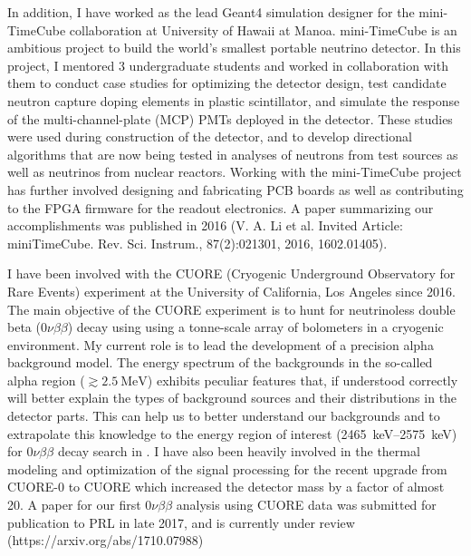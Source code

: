 \documentclass[10pt]{article} %
\begin{document}
In addition, I have worked as the lead Geant4 simulation designer for the
mini-TimeCube collaboration at University of Hawaii at Manoa. mini-TimeCube is
an ambitious project to build the world's smallest portable neutrino detector.
In this project, I mentored 3 undergraduate students and worked in
collaboration with them to conduct case studies for optimizing the detector
design, test candidate neutron capture doping elements in plastic scintillator,
and simulate the response of the multi-channel-plate (MCP) PMTs deployed in the
detector. These studies were used during construction of the detector, and to
develop directional algorithms that are now being tested in analyses of
neutrons from test sources as well as neutrinos from nuclear reactors.
Working with the mini-TimeCube project has further involved designing and
fabricating PCB boards as well as contributing to the FPGA firmware for the
readout electronics. A paper summarizing our accomplishments was published in
2016 (V. A. Li et al. Invited Article: miniTimeCube. Rev. Sci. Instrum.,
87(2):021301, 2016, 1602.01405).

I have been involved with the CUORE (Cryogenic Underground Observatory for Rare
Events) experiment at the University of California, Los Angeles since 2016. The
main objective of the CUORE experiment is to hunt for neutrinoless double beta
($0\nu\beta\beta$) decay using  using a tonne-scale array of
bolometers in a cryogenic environment. My current role is to lead the
development of a precision alpha background model. The energy spectrum of the
backgrounds in the so-called alpha region ($\gtrsim
\SI{2.5}{\mega\electronvolt}$) exhibits peculiar features that, if understood
correctly will better explain the types of background sources and their
distributions in the detector parts. This can help us to better understand our
backgrounds and to extrapolate this knowledge to the energy region of interest
(\SIrange{2465}{2575}{\kilo\electronvolt}) for $0\nu\beta\beta$ decay search in
. I have also been heavily involved in the thermal modeling and
optimization of the signal processing for the recent upgrade from CUORE-0 to
CUORE which increased the detector mass by a factor of almost 20. A paper for
our first $0\nu\beta\beta$ analysis using CUORE data was submitted for
publication to PRL in late 2017, and is currently under review
(https://arxiv.org/abs/1710.07988)
\end{document}
